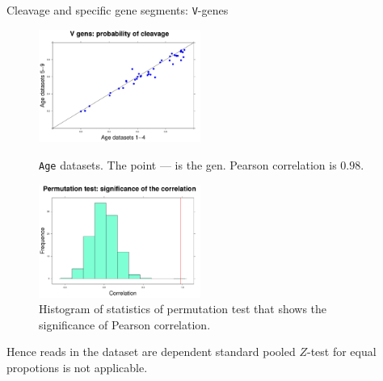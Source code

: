 \documentclass{beamer}\usepackage[]{graphicx}\usepackage[]{color}
\begin{document}
\begin{frame}{Cleavage and specific gene segments: \texttt{V}-genes}
 \begin{figure}[h]
  \begin{minipage}[h]{0.49\linewidth}
    \center\includegraphics[width=150pt]{Vgen_cleavage_age.pdf}
    \caption{\footnotesize{\texttt{Age} datasets. The point --- is the gen. Pearson correlation is $0.98$.}} 
  \end{minipage}
  \hfill
  \begin{minipage}[h]{0.49\linewidth}
   \includegraphics[width=150pt]{Vgen_cleavage_age_correlation.pdf}
    \caption{\footnotesize{Histogram of statistics of permutation test that shows the significance of Pearson correlation.}} 
  \end{minipage}
 \end{figure}
 \pause
 {\color{blue} Hence reads in the dataset are dependent standard pooled $Z$-test for equal propotions is not applicable.}
 
\end{frame}

\end{document}
